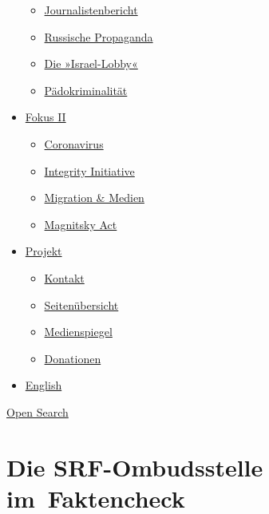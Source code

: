 \begin{itemize}
  \begin{itemize}
  \tightlist
  \item
    \href{https://swprs.org/bericht-eines-journalisten/}{Journalistenbericht}
  \item
    \href{https://swprs.org/russische-propaganda/}{Russische Propaganda}
  \item
    \href{https://swprs.org/die-israel-lobby-fakten-und-mythen/}{Die
    »Israel-Lobby«}
  \item
    \href{https://swprs.org/geopolitik-und-paedokriminalitaet/}{Pädokriminalität}
  \end{itemize}
\item
  \href{https://swprs.org/migration-und-medien/}{Fokus II}

  \begin{itemize}
  \tightlist
  \item
    \href{https://swprs.org/covid-19-hinweis-ii/}{Coronavirus}
  \item
    \href{https://swprs.org/die-integrity-initiative/}{Integrity
    Initiative}
  \item
    \href{https://swprs.org/migration-und-medien/}{Migration \& Medien}
  \item
    \href{https://swprs.org/der-fall-magnitsky/}{Magnitsky Act}
  \end{itemize}
\item
  \href{https://swprs.org/kontakt/}{Projekt}

  \begin{itemize}
  \tightlist
  \item
    \href{https://swprs.org/kontakt/}{Kontakt}
  \item
    \href{https://swprs.org/uebersicht/}{Seitenübersicht}
  \item
    \href{https://swprs.org/medienspiegel/}{Medienspiegel}
  \item
    \href{https://swprs.org/donationen/}{Donationen}
  \end{itemize}
\item
  \href{https://swprs.org/contact/}{English}
\end{itemize}

\protect\hyperlink{}{Open Search}

\hypertarget{die-srf-ombudsstelle-im-faktencheck}{%
\section{Die SRF-Ombudsstelle
im~Faktencheck}\label{die-srf-ombudsstelle-im-faktencheck}}

